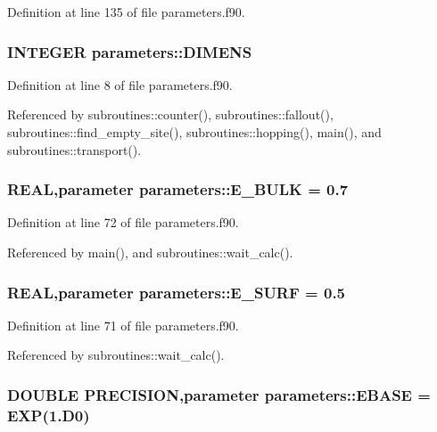 Definition at line 135 of file parameters.f90.\hypertarget{namespaceparameters_a8eba14af35a7a362f50093f1acc28a78}{
\subsubsection[{DIMENS}]{\setlength{\rightskip}{0pt plus 5cm}INTEGER {\bf parameters::DIMENS}}}
\label{namespaceparameters_a8eba14af35a7a362f50093f1acc28a78}


Definition at line 8 of file parameters.f90.

Referenced by subroutines::counter(), subroutines::fallout(), subroutines::find\_\-empty\_\-site(), subroutines::hopping(), main(), and subroutines::transport().\hypertarget{namespaceparameters_a485a71bfcc9a08ed577efe9a5df5735b}{
\subsubsection[{E\_\-BULK}]{\setlength{\rightskip}{0pt plus 5cm}REAL,parameter {\bf parameters::E\_\-BULK} = 0.7}}
\label{namespaceparameters_a485a71bfcc9a08ed577efe9a5df5735b}


Definition at line 72 of file parameters.f90.

Referenced by main(), and subroutines::wait\_\-calc().\hypertarget{namespaceparameters_a10dd39ec5aeb14b9a104618dc6ef5450}{
\subsubsection[{E\_\-SURF}]{\setlength{\rightskip}{0pt plus 5cm}REAL,parameter {\bf parameters::E\_\-SURF} = 0.5}}
\label{namespaceparameters_a10dd39ec5aeb14b9a104618dc6ef5450}


Definition at line 71 of file parameters.f90.

Referenced by subroutines::wait\_\-calc().\hypertarget{namespaceparameters_a1e704da9f69bebf69c8a5d07e3703622}{
\subsubsection[{EBASE}]{\setlength{\rightskip}{0pt plus 5cm}DOUBLE PRECISION,parameter {\bf parameters::EBASE} = EXP(1.D0)}}
\label{namespaceparameters_a1e704da9f69bebf69c8a5d07e3703622}


